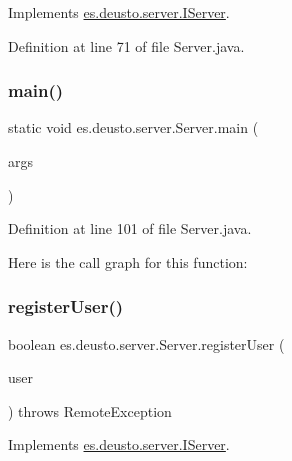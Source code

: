 Implements \mbox{\hyperlink{interfacees_1_1deusto_1_1server_1_1_i_server_a479231082cae13f9c651c0ec2cb2cece}{es.\+deusto.\+server.\+I\+Server}}.



Definition at line 71 of file Server.\+java.

\mbox{\label{classes_1_1deusto_1_1server_1_1_server_a750bb0d7dbd89246a3602f2e20d03fb5}} 
\subsubsection{\texorpdfstring{main()}{main()}}
{\footnotesize\ttfamily static void es.\+deusto.\+server.\+Server.\+main (\begin{DoxyParamCaption}\item[{String \mbox{[}$\,$\mbox{]}}]{args }\end{DoxyParamCaption})\hspace{0.3cm}{\ttfamily [static]}}



Definition at line 101 of file Server.\+java.

Here is the call graph for this function\+:
\mbox{\label{classes_1_1deusto_1_1server_1_1_server_a6a419bd82bce60f072b4c7f5a527abdc}} 
\subsubsection{\texorpdfstring{registerUser()}{registerUser()}}
{\footnotesize\ttfamily boolean es.\+deusto.\+server.\+Server.\+register\+User (\begin{DoxyParamCaption}\item[{\mbox{\hyperlink{classes_1_1deusto_1_1server_1_1data_1_1_user_details_d_t_o}{User\+Details\+D\+TO}}}]{user }\end{DoxyParamCaption}) throws Remote\+Exception}



Implements \mbox{\hyperlink{interfacees_1_1deusto_1_1server_1_1_i_server_a998e20655e760b135fab601a417aa5ae}{es.\+deusto.\+server.\+I\+Server}}.



